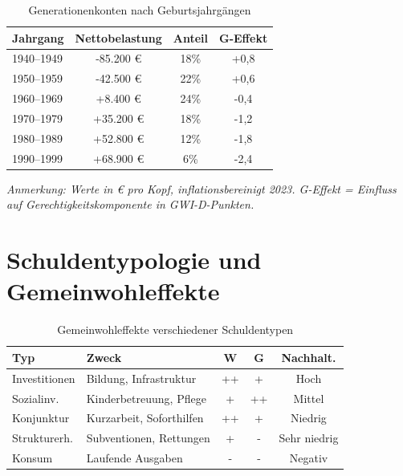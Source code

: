 \begin{table}[ht]
    \centering
    \footnotesize
    \caption{Generationenkonten nach Geburtsjahrgängen}
    \label{tab:generationenkonten}
    \begin{tabular}{@{}lccc@{}}
        \toprule
        \textbf{Jahrgang} & \textbf{Nettobelastung} & \textbf{Anteil} & \textbf{G-Effekt} \\
        \midrule
        1940–1949 & -85.200 € & 18\% & +0,8 \\
        1950–1959 & -42.500 € & 22\% & +0,6 \\
        1960–1969 & +8.400 € & 24\% & -0,4 \\
        1970–1979 & +35.200 € & 18\% & -1,2 \\
        1980–1989 & +52.800 € & 12\% & -1,8 \\
        1990–1999 & +68.900 € & 6\% & -2,4 \\
        \bottomrule
    \end{tabular}
\end{table}

\begin{flushleft}
\scriptsize{\textit{Anmerkung: Werte in € pro Kopf, inflationsbereinigt 2023. G-Effekt = Einfluss auf Gerechtigkeitskomponente in GWI-D-Punkten.}}
\end{flushleft}

\section{Schuldentypologie und Gemeinwohleffekte}

\begin{table}[ht]
    \centering
    \footnotesize
    \caption{Gemeinwohleffekte verschiedener Schuldentypen}
    \label{tab:schuldentypen_wirkung}
    \begin{tabular}{@{}lp{3cm}ccc@{}}
        \toprule
        \textbf{Typ} & \textbf{Zweck} & \textbf{W} & \textbf{G} & \textbf{Nachhalt.} \\
        \midrule
        Investitionen & Bildung, Infrastruktur & ++ & + & Hoch \\
        Sozialinv. & Kinderbetreuung, Pflege & + & ++ & Mittel \\
        Konjunktur & Kurzarbeit, Soforthilfen & ++ & + & Niedrig \\
        Strukturerh. & Subventionen, Rettungen & + & - & Sehr niedrig \\
        Konsum & Laufende Ausgaben & - & - & Negativ \\
        \bottomrule
    \end{tabular}
\end{table}

